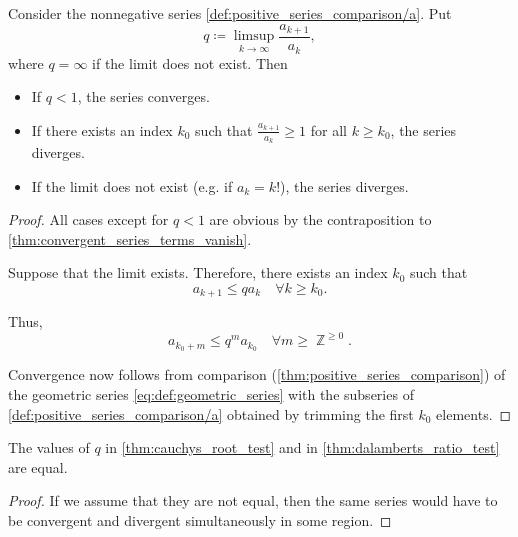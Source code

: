 \begin{proposition}\label{thm:dalamberts_ratio_test}
  Consider the nonnegative series \cref{def:positive_series_comparison/a}. Put
  \begin{equation*}
    q \coloneqq \limsup_{k \to \infty} \frac {a_{k+1}} {a_k},
  \end{equation*}
  where \( q = \infty \) if the limit does not exist. Then
  \begin{itemize}
    \item If \( q < 1 \), the series converges.
    \item If there exists an index \( k_0 \) such that \( \frac {a_{k+1}} {a_k} \geq 1 \) for all \( k \geq k_0 \), the series diverges.
    \item If the limit does not exist (e.g. if \( a_k = k! \)), the series diverges.
  \end{itemize}
\end{proposition}
\begin{proof}
  All cases except for \( q < 1 \) are obvious by the contraposition to \cref{thm:convergent_series_terms_vanish}.

  Suppose that the limit exists. Therefore, there exists an index \( k_0 \) such that
  \begin{equation*}
    a_{k+1} \leq q a_k \quad\forall k \geq k_0.
  \end{equation*}

  Thus,
  \begin{equation*}
    a_{k_0 + m} \leq q^m a_{k_0} \quad\forall m \geq \BbbZ^{\geq 0}.
  \end{equation*}

  Convergence now follows from comparison (\cref{thm:positive_series_comparison}) of the geometric series \eqref{eq:def:geometric_series} with the subseries of \cref{def:positive_series_comparison/a} obtained by trimming the first \( k_0 \) elements.
\end{proof}

\begin{proposition}\label{rem:nonnegative_series_convergence_test_equivalence}
  The values of \( q \) in \cref{thm:cauchys_root_test} and in \cref{thm:dalamberts_ratio_test} are equal.
\end{proposition}
\begin{proof}
  If we assume that they are not equal, then the same series would have to be convergent and divergent simultaneously in some region.
\end{proof}

